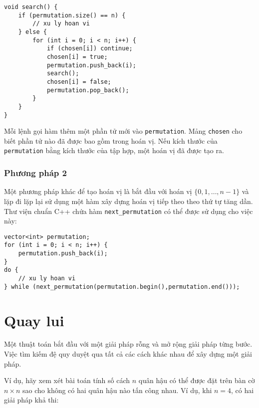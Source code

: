\begin{lstlisting}
void search() {
    if (permutation.size() == n) {
        // xu ly hoan vi
    } else {
        for (int i = 0; i < n; i++) {
            if (chosen[i]) continue;
            chosen[i] = true;
            permutation.push_back(i);
            search();
            chosen[i] = false;
            permutation.pop_back();
        }
    }
}
\end{lstlisting}

Mỗi lệnh gọi hàm thêm một phần tử mới vào
\texttt{permutation}.
Mảng \texttt{chosen} cho biết
phần tử nào đã được bao gồm trong hoán vị.
Nếu kích thước của \texttt{permutation} bằng kích thước của tập hợp,
một hoán vị đã được tạo ra.

\subsubsection{Phương pháp 2}


Một phương pháp khác để tạo hoán vị
là bắt đầu với hoán vị
$\{0,1,\ldots,n-1\}$ và lặp đi lặp lại
sử dụng một hàm xây dựng hoán vị tiếp theo
theo thứ tự tăng dần.
Thư viện chuẩn C++ chứa hàm
\texttt{next\_permutation} có thể được sử dụng cho việc này:

\begin{lstlisting}
vector<int> permutation;
for (int i = 0; i < n; i++) {
    permutation.push_back(i);
}
do {
    // xu ly hoan vi
} while (next_permutation(permutation.begin(),permutation.end()));
\end{lstlisting}

\section{Quay lui}


Một thuật toán 
bắt đầu với một giải pháp rỗng
và mở rộng giải pháp từng bước.
Việc tìm kiếm đệ quy
duyệt qua tất cả các cách khác nhau để
xây dựng một giải pháp.


Ví dụ, hãy xem xét bài toán
tính số cách
$n$ quân hậu có thể được đặt trên
bàn cờ $n \times n$ sao cho
không có hai quân hậu nào tấn công nhau.
Ví dụ, khi $n=4$,
có hai giải pháp khả thi:

\begin{center}
\end{center}

